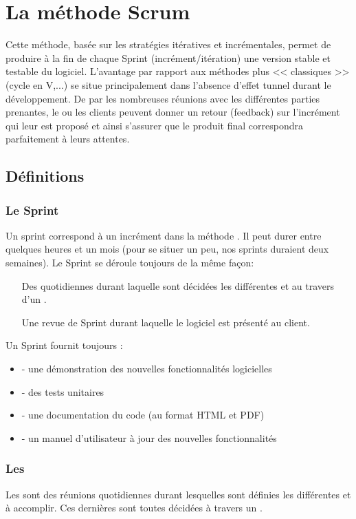 \section{La méthode Scrum}\label{methodeScrum}
Cette méthode, basée sur les stratégies itératives et incrémentales, permet de produire à la
fin de chaque Sprint (incrément/itération) une version stable et testable du logiciel. L'avantage
par rapport aux méthodes plus << classiques >> (cycle en V,...) se situe principalement dans l'absence
d'effet tunnel durant le développement. De par les nombreuses réunions avec les différentes parties prenantes,
le ou les clients peuvent donner un retour (feedback) sur l'incrément qui leur est proposé et ainsi
s'assurer que le produit final correspondra parfaitement à leurs attentes.  

\subsection{Définitions}

\subsubsection{Le Sprint}
Un sprint correspond à un incrément dans la méthode \Scrum. Il peut durer entre quelques heures et un mois (pour se situer un peu, nos sprints duraient deux semaines). Le Sprint se déroule toujours de la même façon:
\begin{itemize}
	\item[Des \Melees{} quotidiennes] durant laquelle sont décidées les différentes \UserStories{} et \TechnicalStories{} au travers d'un \PlanningPoker.
	\item[Une revue de Sprint] durant laquelle le logiciel est présenté au client.
\end{itemize}

Un Sprint fournit toujours :
\begin{itemize}
	\item - une démonstration des nouvelles fonctionnalités logicielles
	\item - des tests unitaires
	\item - une documentation du code (au format HTML et PDF)
	\item - un manuel d’utilisateur à jour des nouvelles fonctionnalités
\end{itemize}
\subsubsection{Les \Melees} 
Les \Melees{} sont des réunions quotidiennes durant lesquelles sont définies les différentes \UserStories{} et \TechnicalStories{} à accomplir. Ces dernières sont toutes décidées à travers un \PlanningPoker.

